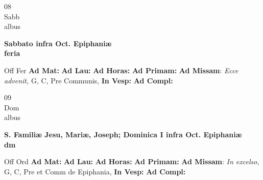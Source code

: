 \documentclass[10pt, openany]{book}
\begin{document}
        \begin{center}
            \begin{minipage}{3.5in}
                \vspace{2em}
                \begin{minipage}{0.5in}
                    {\Huge 08} \\
                    {\normalsize Sabb} \\
                    {\normalsize albus}
                \end{minipage}
                \begin{minipage}{3.0in}
                    \textbf{ \large Sabbato infra Oct. Epiphaniæ \\
                    \textnormal{\normalsize feria}} \\ 
                \end{minipage}
                \begin{justify}Off Fer
                    \textbf{Ad Mat: }
                    \textbf{Ad Lau: }
                    \textbf{Ad Horas: }
                    \textbf{Ad Primam: }\textbf{Ad Missam}: \textit{Ecce advenit,} G, C, Pre Communis,  
                    \textbf{In Vesp: }
                    \textbf{Ad Compl: }
                \end{justify}
            \end{minipage}
        \end{center}
    
        \begin{center}
            \begin{minipage}{3.5in}
                \vspace{2em}
                \begin{minipage}{0.5in}
                    {\Huge 09} \\
                    {\normalsize Dom} \\
                    {\normalsize albus}
                \end{minipage}
                \begin{minipage}{3.0in}
                    \textbf{ \large S. Familiæ Jesu, Mariæ, Joseph; Dominica I infra Oct. Epiphaniæ \\
                    \textnormal{\normalsize dm}} \\ 
                \end{minipage}
                \begin{justify}Off Ord
                    \textbf{Ad Mat: }
                    \textbf{Ad Lau: }
                    \textbf{Ad Horas: }
                    \textbf{Ad Primam: }\textbf{Ad Missam}: \textit{In excelso,} G, C, Pre et Comm de Epiphania,  
                    \textbf{In Vesp: }
                    \textbf{Ad Compl: }
                \end{justify}
            \end{minipage}
        \end{center}
    
\end{document}
